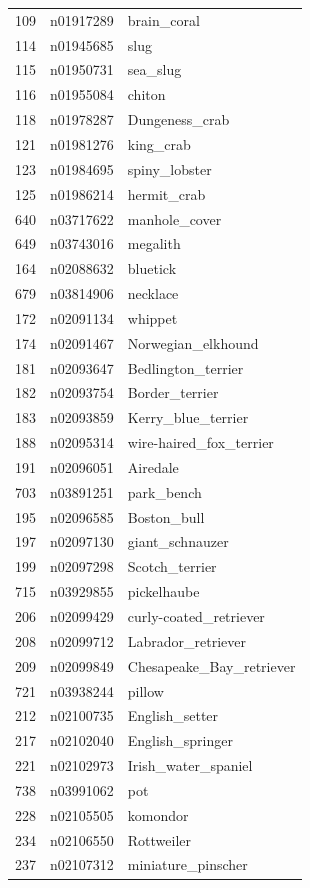\begin{table}
\begin{tabular}{cll}
109 & n01917289 & brain_coral \\
114 & n01945685 & slug \\
115 & n01950731 & sea_slug \\
116 & n01955084 & chiton \\
118 & n01978287 & Dungeness_crab \\
121 & n01981276 & king_crab \\
123 & n01984695 & spiny_lobster \\
125 & n01986214 & hermit_crab \\
640 & n03717622 & manhole_cover \\
649 & n03743016 & megalith \\
164 & n02088632 & bluetick \\
679 & n03814906 & necklace \\
172 & n02091134 & whippet \\
174 & n02091467 & Norwegian_elkhound \\
181 & n02093647 & Bedlington_terrier \\
182 & n02093754 & Border_terrier \\
183 & n02093859 & Kerry_blue_terrier \\
188 & n02095314 & wire-haired_fox_terrier \\
191 & n02096051 & Airedale \\
703 & n03891251 & park_bench \\
195 & n02096585 & Boston_bull \\
197 & n02097130 & giant_schnauzer \\
199 & n02097298 & Scotch_terrier \\
715 & n03929855 & pickelhaube \\
206 & n02099429 & curly-coated_retriever \\
208 & n02099712 & Labrador_retriever \\
209 & n02099849 & Chesapeake_Bay_retriever \\
721 & n03938244 & pillow \\
212 & n02100735 & English_setter \\
217 & n02102040 & English_springer \\
221 & n02102973 & Irish_water_spaniel \\
738 & n03991062 & pot \\
228 & n02105505 & komondor \\
234 & n02106550 & Rottweiler \\
237 & n02107312 & miniature_pinscher \\

\end{tabular}
\end{table}
